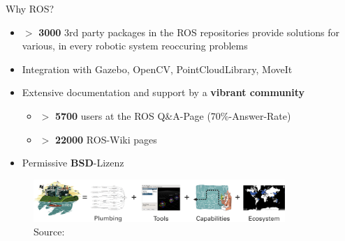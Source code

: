 \documentclass{beamer}
\begin{document}
\begin{frame}{Why ROS?}
 \begin{itemize}
 \item $>$ \textbf{3000} 3rd party packages in the ROS repositories provide solutions for various, in every robotic system reoccuring problems
 \item Integration with Gazebo, OpenCV, PointCloudLibrary, MoveIt
 \item Extensive documentation and support by a \textbf{vibrant community}
 \begin{itemize}
  \item $>$ \textbf{5700} users at the ROS Q\&{}A-Page (70\%-Answer-Rate)
  \item $>$ \textbf{22000} ROS-Wiki pages
 \end{itemize}
 \item Permissive \textbf{BSD}-Lizenz
 \end{itemize}
 \begin{figure}[H]
  \centering
  \includegraphics[width=0.85\textwidth]{./images/ros-equation.png}
  \caption{Source: \cite{ROS:2015:Online}}
  \label{fig:ros_equation}
 \end{figure}
\end{frame}
\end{document}
